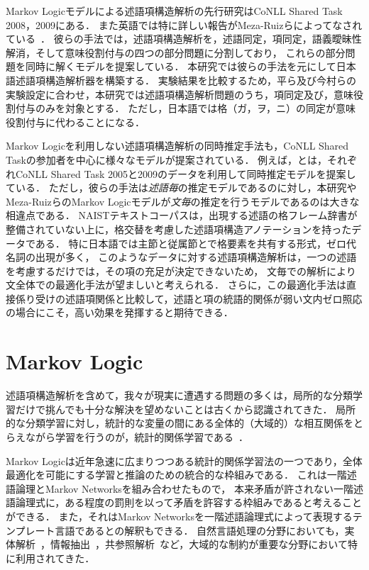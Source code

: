 \documentclass[japanese]{jnlp_1.4}
\begin{document}
Markov Logicモデルによる述語項構造解析の先行研究はCoNLL Shared Task 2008，2009にある．
また英語では特に詳しい報告がMeza-Ruizらによってなされている~\cite{meza:2009:naacl}．
彼らの手法では，述語項構造解析を，述語同定，項同定，語義曖昧性解消，そして意味役割付与の四つの部分問題に分割しており，
これらの部分問題を同時に解くモデルを提案している．
本研究では彼らの手法を元にして日本語述語項構造解析器を構築する．
実験結果を比較するため，平ら及び今村らの実験設定に合わせ，本研究では述語項構造解析問題のうち，項同定及び，意味役割付与のみを対象とする．
ただし，日本語では格（ガ，ヲ，ニ）の同定が意味役割付与に代わることになる．

Markov Logicを利用しない述語項構造解析の同時推定手法も，CoNLL Shared Taskの参加者を中心に様々なモデルが提案されている．
例えば，\cite{toutanova:2008:cl}と\cite{watanabe:2010:acl}は，それぞれCoNLL Shared Task 2005と2009のデータを利用して同時推定モデルを提案している．
ただし，彼らの手法は\emph{述語毎}の推定モデルであるのに対し，本研究やMeza-RuizらのMarkov Logicモデルが\emph{文毎}の推定を行うモデルであるのは大きな相違点である．
NAISTテキストコーパスは，出現する述語の格フレーム辞書が整備されていない上に，格交替を考慮した述語項構造アノテーションを持ったデータである．
特に日本語では主節と従属節とで格要素を共有する形式，ゼロ代名詞の出現が多く，
このようなデータに対する述語項構造解析は，一つの述語を考慮するだけでは，その項の充足が決定できないため，
文毎での解析により文全体での最適化手法が望ましいと考えられる．
さらに，この最適化手法は直接係り受けの述語項関係と比較して，述語と項の統語的関係が弱い文内ゼロ照応の場合にこそ，高い効果を発揮すると期待できる．


\section{Markov Logic}
\label{mln}

述語項構造解析を含めて，我々が現実に遭遇する問題の多くは，局所的な分類学習だけで挑んでも十分な解決を望めないことは古くから認識されてきた．
局所的な分類学習に対し，統計的な変量の間にある全体的（大域的）な相互関係をとらえながら学習を行うのが，統計的関係学習である~\cite{ng:1992}．

Markov Logicは近年急速に広まりつつある統計的関係学習法の一つであり，全体最適化を可能にする学習と推論のための統合的な枠組みである．
これは一階述語論理とMarkov Networksを組み合わせたもので，
本来矛盾が許されない一階述語論理式に，ある程度の罰則を以って矛盾を許容する枠組みであると考えることができる．
また，それはMarkov Networksを一階述語論理式によって表現するテンプレート言語であるとの解釈もできる．
自然言語処理の分野においても，実体解析~\cite{singla:2006:icdm}，情報抽出~\cite{poon:2007:aaai}，共参照解析~\cite{poon:2008:emnlp}など，大域的な制約が重要な分野において特に利用されてきた．
\end{document}
